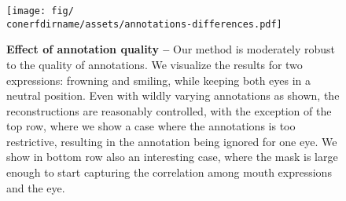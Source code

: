 \begin{figure}
  \centering
  \texttt{[image: fig/\\conerfdirname/assets/annotations-differences.pdf]}
  \caption{{\bf Effect of annotation quality -- }
    Our method is moderately robust to the quality of annotations.
    We visualize the results for two expressions: frowning and smiling, while
    keeping both eyes in a neutral position.
    Even with wildly varying annotations as shown, the reconstructions are
    reasonably controlled, with the exception of the top row, where we show a
    case where the annotations is too restrictive, resulting in the annotation
    being ignored for one eye.
    We show in bottom row also an interesting case, where the mask is large
    enough to start capturing the correlation among mouth expressions and the
    eye.
  }
  \label{fig:conerf-ablation_annotate}
\end{figure}